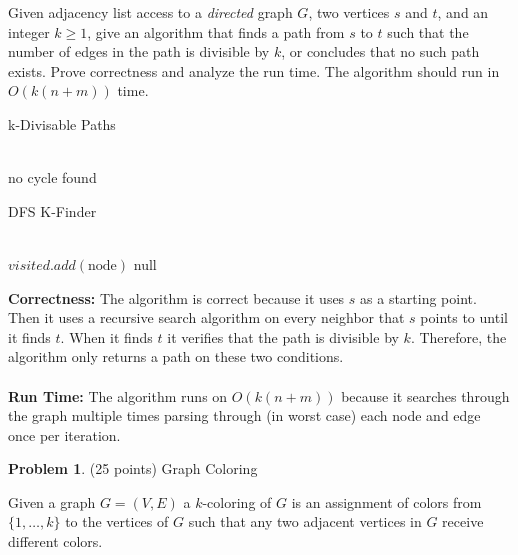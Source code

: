 \documentclass[11pt]{article}
\theoremstyle{definition}
\theoremstyle{theorem}
\newtheorem{prob}{Problem}
\begin{document}
Given adjacency list access to a \emph{directed} graph $G$, two vertices $s$ and $t$, and an integer $k \geq 1$, give an algorithm that finds a path from $s$ to $t$ such that the number of edges in the path is divisible by $k$, or concludes that no such path exists. Prove correctness and analyze the run time. The algorithm should run in $O(k(n + m))$ time. \\
\begin{algorithm}[H]
\caption{k-Divisable Paths}
 \\ {
        \Return no cycle found
}
\end{algorithm}
\begin{algorithm}[H]
\caption{DFS K-Finder}
 \\ {
        $visited.add(\text{node})$
        \Return null
}
\end{algorithm}
\textbf{Correctness: } The algorithm is correct because it uses $s$ as a starting point. Then it uses a recursive search algorithm on every neighbor that $s$ points to until it finds $t$. When it finds $t$ it verifies that the path is divisible by $k$. Therefore, the algorithm only returns a path on these two conditions. \\\\
\textbf{Run Time: } The algorithm runs on $O(k(n + m))$ because it searches through the graph multiple times parsing through (in worst case) each node and edge once per iteration.

\newpage

\begin{prob}
	(25 points) Graph Coloring
\end{prob}

Given a graph $G=(V, E)$ a $k$-coloring of $G$ is an assignment of colors from $\{1, \ldots, k\}$ to the vertices of $G$ such that any two adjacent vertices in $G$ receive different colors.
\end{document}
